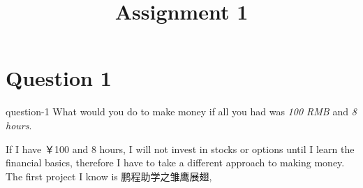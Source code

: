 \title{Assignment 1}
\maketitle

\section{Question 1}
\begin{statebox}{}{question-1}
    What would you do to make money if all you had was \emph{100 RMB} and \emph{8 hours}.
\end{statebox}
If I have ￥100 and 8 hours, I will not invest in stocks or options until I learn the financial basics, therefore I have to take a different approach to making money. The first project I know is 鹏程助学之雏鹰展翅, 




